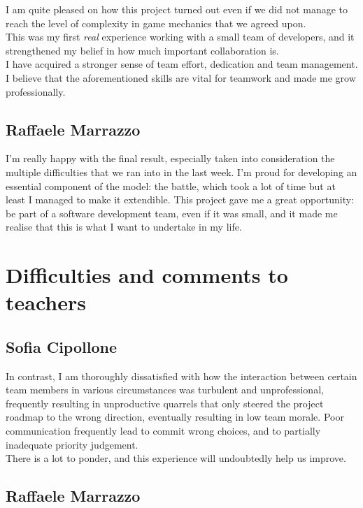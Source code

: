 \documentclass[12pt, a4paper]{report}
\theoremstyle{definition}
\begin{document}
    I am quite pleased on how this project turned out even if we did not manage to reach the level of complexity in game mechanics that we agreed upon.\\
    This was my first \textit{real} experience working with a small team of developers, and it strengthened my belief in how much important collaboration is.\\
    I have acquired a stronger sense of team effort, dedication and team management. I believe that the aforementioned skills are vital for teamwork and made
    me grow professionally.

    \subsection*{Raffaele Marrazzo}
    
    I'm really happy with the final result, especially taken into consideration the multiple difficulties that we ran into in the last week.
    I'm proud for developing an essential component of the model: the battle, which took a lot of time but at least I managed to make it extendible.
    This project gave me a great opportunity: be part of a software development team, even if it was small, and it made me realise that this is what 
    I want to undertake in my life.

\section{Difficulties and comments to teachers}

    \subsection*{Sofia Cipollone}

    In contrast, I am thoroughly dissatisfied with how the interaction between certain team members in various circumstances was turbulent and unprofessional,
    frequently resulting in unproductive quarrels that only steered the project roadmap to the wrong direction, eventually resulting in low team morale.
    Poor communication frequently lead to commit wrong choices, and to partially inadequate priority judgement.\\
    There is a lot to ponder, and this experience will undoubtedly help us improve.

    \subsection*{Raffaele Marrazzo}
\end{document}
